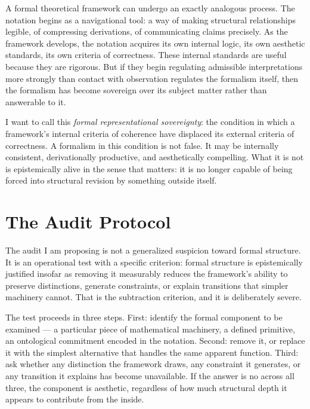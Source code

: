 \documentclass[12pt, a4paper]{article}
\begin{document}
A formal theoretical framework can undergo an exactly analogous process. The notation begins as a navigational tool: a way of making structural relationships legible, of compressing derivations, of communicating claims precisely. As the framework develops, the notation acquires its own internal logic, its own aesthetic standards, its own criteria of correctness. These internal standards are useful because they are rigorous. But if they begin regulating admissible interpretations more strongly than contact with observation regulates the formalism itself, then the formalism has become sovereign over its subject matter rather than answerable to it.

I want to call this \textit{formal representational sovereignty}: the condition in which a framework's internal criteria of coherence have displaced its external criteria of correctness. A formalism in this condition is not false. It may be internally consistent, derivationally productive, and aesthetically compelling. What it is not is epistemically alive in the sense that matters: it is no longer capable of being forced into structural revision by something outside itself.

\section{The Audit Protocol}

The audit I am proposing is not a generalized suspicion toward formal structure. It is an operational test with a specific criterion: formal structure is epistemically justified insofar as removing it measurably reduces the framework's ability to preserve distinctions, generate constraints, or explain transitions that simpler machinery cannot. That is the subtraction criterion, and it is deliberately severe.

The test proceeds in three steps. First: identify the formal component to be examined --- a particular piece of mathematical machinery, a defined primitive, an ontological commitment encoded in the notation. Second: remove it, or replace it with the simplest alternative that handles the same apparent function. Third: ask whether any distinction the framework draws, any constraint it generates, or any transition it explains has become unavailable. If the answer is no across all three, the component is aesthetic, regardless of how much structural depth it appears to contribute from the inside.
\end{document}
